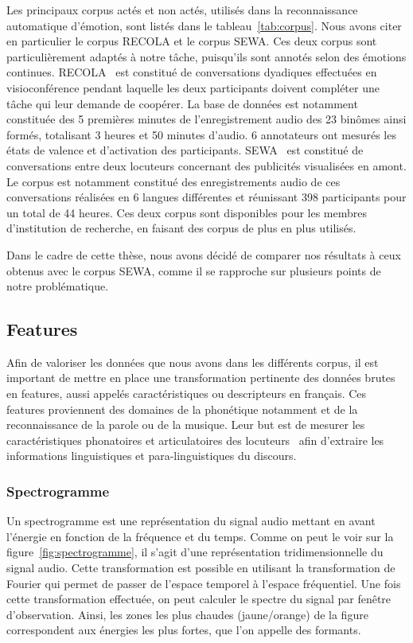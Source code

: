 

Les principaux corpus actés et non actés, utilisés dans la reconnaissance automatique d'émotion, sont listés dans le tableau~\ref{tab:corpus}. Nous avons citer en particulier le corpus RECOLA et le corpus SEWA. Ces deux corpus sont particulièrement adaptés à notre tâche, puisqu'ils sont annotés selon des émotions continues.
RECOLA~\cite{Ringeval2013} est constitué de conversations dyadiques effectuées en visioconférence pendant laquelle les deux participants doivent compléter une tâche qui leur demande de coopérer. La base de données est notamment constituée des 5 premières minutes de l'enregistrement audio des 23 binômes ainsi formés, totalisant 3 heures et 50 minutes d'audio. 6 annotateurs ont mesurés les états de valence et d'activation des participants.
SEWA~\cite{SEWA} est constitué de conversations entre deux locuteurs concernant des publicités visualisées en amont. Le corpus est notamment constitué des enregistrements audio de ces conversations réalisées en 6 langues différentes et réunissant 398 participants pour un total de 44 heures. Ces deux corpus sont disponibles pour les membres d'institution de recherche, en faisant des corpus de plus en plus utilisés.

Dans le cadre de cette thèse, nous avons décidé de comparer nos résultats à ceux obtenus avec le corpus SEWA, comme il se rapproche sur plusieurs points de notre problématique.


\subsection{Features}
Afin de valoriser les données que nous avons dans les différents corpus, il est important de mettre en place une transformation pertinente des données brutes en features, aussi appelés caractéristiques ou descripteurs en français.
Ces features proviennent des domaines de la phonétique notamment et de la reconnaissance de la parole ou de la musique. Leur but est de mesurer les caractéristiques phonatoires et articulatoires des locuteurs~\cite{Scherer1986} afin d'extraire les informations linguistiques et para-linguistiques du discours.

\subsubsection{Spectrogramme}


Un spectrogramme est une représentation du signal audio mettant en avant l'énergie en fonction de la fréquence et du temps. Comme on peut le voir sur la figure~\ref{fig:spectrogramme}, il s'agit d'une représentation tridimensionnelle du signal audio. Cette transformation est possible en utilisant la transformation de Fourier qui permet de passer de l'espace temporel à l'espace fréquentiel. Une fois cette transformation effectuée, on peut calculer le spectre du signal par fenêtre d'observation. Ainsi, les zones les plus chaudes (jaune/orange) de la figure correspondent aux énergies les plus fortes, que l'on appelle des formants.

